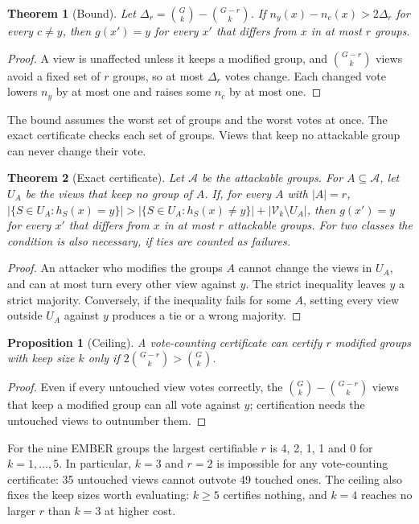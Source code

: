\documentclass[preprint,12pt,authoryear]{elsarticle}
\newtheorem{theorem}{Theorem}
\newtheorem{proposition}{Proposition}
\begin{document}
\begin{theorem}[Bound]\label{thm:abl}
Let $\Delta_r=\binom{G}{k}-\binom{G-r}{k}$. If $n_y(x)-n_c(x)>2\Delta_r$ for every $c\neq y$, then $g(x')=y$ for every $x'$ that differs from $x$ in at most $r$ groups.
\end{theorem}
\begin{proof}
A view is unaffected unless it keeps a modified group, and $\binom{G-r}{k}$ views avoid a fixed set of $r$ groups, so at most $\Delta_r$ votes change. Each changed vote lowers $n_y$ by at most one and raises some $n_c$ by at most one.
\end{proof}

The bound assumes the worst set of groups and the worst votes at once. The exact certificate checks each set of groups. Views that keep no attackable group can never change their vote.
\begin{theorem}[Exact certificate]\label{thm:exact}
Let $\mathcal{A}$ be the attackable groups. For $A\subseteq\mathcal{A}$, let $U_A$ be the views that keep no group of $A$. If, for every $A$ with $|A|=r$,
$|\{S\in U_A:h_S(x)=y\}|>|\{S\in U_A:h_S(x)\neq y\}|+|\mathcal{V}_k\setminus U_A|$,
then $g(x')=y$ for every $x'$ that differs from $x$ in at most $r$ attackable groups. For two classes the condition is also necessary, if ties are counted as failures.
\end{theorem}
\begin{proof}
An attacker who modifies the groups $A$ cannot change the views in $U_A$, and can at most turn every other view against $y$. The strict inequality leaves $y$ a strict majority. Conversely, if the inequality fails for some $A$, setting every view outside $U_A$ against $y$ produces a tie or a wrong majority.
\end{proof}

\begin{proposition}[Ceiling]\label{prop:ceiling}
A vote-counting certificate can certify $r$ modified groups with keep size $k$ only if $2\binom{G-r}{k}>\binom{G}{k}$.
\end{proposition}
\begin{proof}
Even if every untouched view votes correctly, the $\binom{G}{k}-\binom{G-r}{k}$ views that keep a modified group can all vote against $y$; certification needs the untouched views to outnumber them.
\end{proof}
For the nine EMBER groups the largest certifiable $r$ is 4, 2, 1, 1 and 0 for $k=1,\dots,5$. In particular, $k=3$ and $r=2$ is impossible for any vote-counting certificate: 35 untouched views cannot outvote 49 touched ones. The ceiling also fixes the keep sizes worth evaluating: $k\ge5$ certifies nothing, and $k=4$ reaches no larger $r$ than $k=3$ at higher cost.
\end{document}
